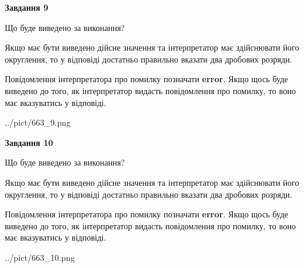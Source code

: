 \documentclass[12pt, ukrainian]{article}
\begin{document}
{\begin {Large}
{\begin {center}\textbf{Завдання 9}\end {center}}\par
Що буде виведено за виконання? \par

Якщо має бути виведено дійсне значення та інтерпретатор має здійснювати його округлення, 
то у відповіді достатньо правильно вказати два дробових розряди.

Повідомлення інтерпретатора про помилку позначати \textbf{error}.
Якщо щось буде виведено до того, як інтерпретатор видасть повідомлення про помилку, 
то воно має вказуватись у відповіді. \par

\begin{center}
	{../pict/663_9.png}
\end{center}
\newpage

{\begin {center}\textbf{Завдання 10}\end {center}}\par
Що буде виведено за виконання? \par

Якщо має бути виведено дійсне значення та інтерпретатор має здійснювати його округлення, 
то у відповіді достатньо правильно вказати два дробових розряди.

Повідомлення інтерпретатора про помилку позначати \textbf{error}.
Якщо щось буде виведено до того, як інтерпретатор видасть повідомлення про помилку, 
то воно має вказуватись у відповіді. \par

\begin{center}
	{../pict/663_10.png}
\end{center}
\newpage

\end {Large}}
\end{document}
